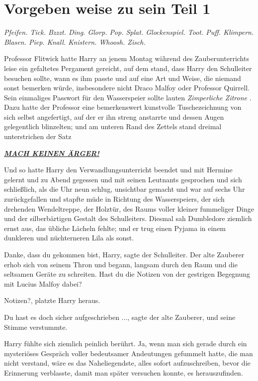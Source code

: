 \chapter{Vorgeben weise zu sein Teil 1}

\emph{Pfeifen. Tick. Bzzzt. Ding. Glorp. Pop. Splat. Glockenspiel. Toot. Puff.
Klimpern. Blasen. Piep. Knall. Knistern. Whoosh. Zisch.}

Professor Flitwick hatte Harry an jenem Montag während des Zauberunterrichts
leise ein gefaltetes Pergament gereicht, auf dem stand, dass Harry den
Schulleiter besuchen sollte, wann es ihm passte und auf eine Art und Weise, die
niemand sonst bemerken würde, insbesondere nicht Draco Malfoy oder Professor
Quirrell. Sein einmaliges Passwort für den Wasserspeier sollte lauten
\emph{\glqq{}Zimperliche Zitrone\grqq{}} . Dazu hatte der Professor eine
bemerkenswert kunstvolle Tuschezeichnung von sich selbst angefertigt, auf der er
ihn streng anstarrte und dessen Augen gelegentlich blinzelten; und am unteren
Rand des Zettels stand dreimal unterstrichen der Satz

\textbf{\emph{\underline{MACH KEINEN ÄRGER!}}}

Und so hatte Harry den Verwandlungsunterricht beendet und mit Hermine gelernt
und zu Abend gegessen und mit seinen Leutnants gesprochen und sich schließlich,
als die Uhr neun schlug, unsichtbar gemacht und war auf sechs Uhr zurückgefallen
und stapfte müde in Richtung des Wasserspeiers, der sich drehenden Wendeltreppe,
der Holztür, des Raums voller kleiner fummeliger Dinge und der silberbärtigen
Gestalt des Schulleiters. Diesmal sah Dumbledore ziemlich ernst aus, das übliche
Lächeln fehlte; und er trug einen Pyjama in einem dunkleren und nüchterneren
Lila als sonst.

\glqq{}Danke, dass du gekommen bist, Harry\grqq{}, sagte der Schulleiter. Der
alte Zauberer erhob sich von seinem Thron und begann, langsam durch den Raum und
die seltsamen Geräte zu schreiten. \glqq{}Hast du die Notizen von der gestrigen
Begegnung mit Lucius Malfoy dabei?\grqq{}

\glqq{}Notizen?\grqq{}, platzte Harry heraus.

\glqq{}Du hast es doch sicher aufgeschrieben ...\grqq{}, sagte der alte Zauberer,
und seine Stimme verstummte.

Harry fühlte sich ziemlich peinlich berührt. Ja, wenn man sich gerade durch ein
mysteriöses Gespräch voller bedeutsamer Andeutungen gefummelt hatte, die man
nicht verstand, wäre es das Naheliegendste, alles sofort aufzuschreiben, bevor
die Erinnerung verblasste, damit man später versuchen konnte, es herauszufinden.


